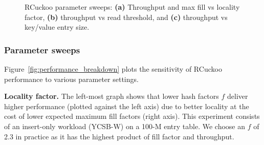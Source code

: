 \begin{figure}[t]
    \vspace{-1em}
    \caption{RCuckoo parameter sweeps:
      \textbf{(a)} Throughput and max fill vs locality factor,
          \textbf{(b)} throughput vs read threshold, and 
    \textbf{(c)} throughput vs key/value entry size.
    }
    \label{fig:performance_breakdown}
             \label{fig:entry_size}
\end{figure}





\subsubsection{Parameter sweeps}

Figure~\ref{fig:performance_breakdown} plots the sensitivity of
RCuckoo performance to various parameter settings.

\textbf{Locality factor.}  The left-most graph shows that lower hash
factors $f$ deliver higher performance (plotted against the left axis)
due to better locality at the cost of lower expected maximum fill
factors (right axis).
This experiment consists of an insert-only workload (YCSB-W)
on a 100-M entry table. We choose an $f$ of 2.3 in practice as
it has the highest product of fill factor and throughput.


